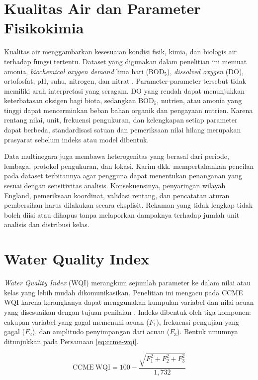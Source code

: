\section{Kualitas Air dan Parameter Fisikokimia}

Kualitas air menggambarkan kesesuaian kondisi fisik, kimia, dan biologis air terhadap fungsi tertentu. Dataset yang digunakan dalam penelitian ini memuat amonia, \textit{biochemical oxygen demand} lima hari (BOD$_5$), \textit{dissolved oxygen} (DO), ortofosfat, pH, suhu, nitrogen, dan nitrat \cite{karim_comprehensive_2025}. Parameter-parameter tersebut tidak memiliki arah interpretasi yang seragam. DO yang rendah dapat menunjukkan keterbatasan oksigen bagi biota, sedangkan BOD$_5$, nutrien, atau amonia yang tinggi dapat mencerminkan beban bahan organik dan pengayaan nutrien. Karena rentang nilai, unit, frekuensi pengukuran, dan kelengkapan setiap parameter dapat berbeda, standardisasi satuan dan pemeriksaan nilai hilang merupakan prasyarat sebelum indeks atau model dibentuk.

Data multinegara juga membawa heterogenitas yang berasal dari periode, lembaga, protokol pengukuran, dan lokasi. Karim dkk. \cite{karim_comprehensive_2025} mempertahankan pencilan pada dataset terbitannya agar pengguna dapat menentukan penanganan yang sesuai dengan sensitivitas analisis. Konsekuensinya, penyaringan wilayah England, pemeriksaan koordinat, validasi rentang, dan pencatatan aturan pembersihan harus dilakukan secara eksplisit. Rekaman yang tidak lengkap tidak boleh diisi atau dihapus tanpa melaporkan dampaknya terhadap jumlah unit analisis dan distribusi kelas.

\section{Water Quality Index}

\textit{Water Quality Index} (WQI) merangkum sejumlah parameter ke dalam nilai atau kelas yang lebih mudah dikomunikasikan. Penelitian ini mengacu pada CCME WQI karena kerangkanya dapat menggunakan kumpulan variabel dan nilai acuan yang disesuaikan dengan tujuan penilaian \cite{ccme_canadian_2007}. Indeks dibentuk oleh tiga komponen: cakupan variabel yang gagal memenuhi acuan ($F_1$), frekuensi pengujian yang gagal ($F_2$), dan amplitudo penyimpangan dari acuan ($F_3$). Bentuk umumnya ditunjukkan pada Persamaan \ref{eq:ccme-wqi}.

\begin{equation}
    \mathrm{CCME\ WQI}=100-\frac{\sqrt{F_1^2+F_2^2+F_3^2}}{1{,}732}
    \label{eq:ccme-wqi}
\end{equation}

